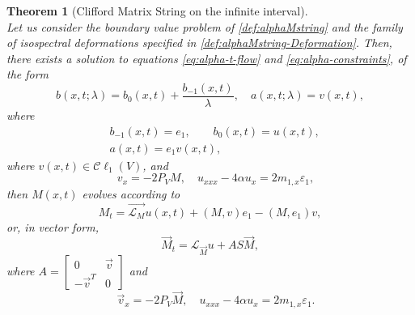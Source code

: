 \documentclass[10pt,a4paper]{article}
\numberwithin{equation}{section}
\theoremstyle{plain}
\newtheorem{theorem}{Theorem}[section]
\theoremstyle{definition}
\renewcommand{\epsilon}{\varepsilon}
\newcommand\Cl{\mathcal{C}\ell}
\newcommand{\InMf}{\stackrel{\rightarrow}{\mathcal{L}_{M}}}
\begin{document}
\begin{theorem}[Clifford Matrix String on the infinite interval]
\mbox{}\\
Let us consider the boundary value problem of \autoref{def:alphaMstring} and 
the family of isospectral deformations specified in \autoref{def:alphaMstring-Deformation}.  
 Then, there exists a solution to equations \eqref{eq:alpha-t-flow} and 
\eqref{eq:alpha-constraints}, of the form  
\begin{equation} \label{eq:alphaEB}
b(x,t; \lambda)=b_0(x,t)+\frac{b_{-1}(x,t)}{\lambda}, \quad a(x,t; \lambda)=v(x,t), 
\end{equation} 
where 
\begin{align}
&b_{-1}(x,t)=e_1, \qquad b_0(x,t)=u(x,t),\\
&      a(x,t)=e_1 v(x,t), \hspace{3cm}
\end{align}
where $v(x,t)\in \Cl_1(V)$, and 
\begin{equation} \label{eq:vx,uxxx line}
 \quad v_x=-2P_V M, \quad u_{xxx}-4\alpha u_x=2m_{1, x}\epsilon_1, 
\end{equation} 
then $M(x,t)$ evolves according to 
\begin{equation} \label{eq:Cliff line}
M_t=\InMf u(x,t)+(M,v)e_1-(M, e_1)v, 
\end{equation} 
or, in vector form, 
\begin{equation} \label{eq:VCliff line}
\vec{M}_t=\mathcal{L}_{\vec{M}} u+AS\vec{M}, 
\end{equation} 
where $A=\begin{bmatrix} 0&\vec{v}\\-\vec{v}^T&0 \end{bmatrix}$ and 
\begin{equation} \label{eq:Vconstraints line} 
\quad \vec{v}_x=-2P_V \vec{M}, \quad u_{xxx}-4\alpha u_x=2m_{1, x}\epsilon_1. 
\end{equation}
\end{theorem} 
\end{document}
